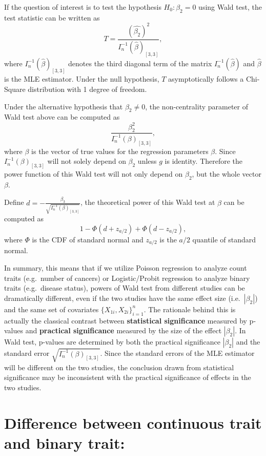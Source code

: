 \documentclass[
]{article}
\begin{document}
If the question of interest is to test the hypothesis \(H_0: \beta_2=0\)
using Wald test, the test statistic can be written as
\[T = \frac{(\hat{\beta_2})^2}{I_n^{-1}(\hat{\beta})_{[3,3]}},\] where
\(I_n^{-1}(\hat{\beta})_{[3,3]}\) denotes the third diagonal term of the
matrix \(I_n^{-1}(\hat{\beta})\) and \(\hat{\beta}\) is the MLE
estimator. Under the null hypothesis, \(T\) asymptotically follows a
Chi-Square distribution with 1 degree of freedom.

Under the alternative hypothesis that \(\beta_2 \neq 0\), the
non-centrality parameter of Wald test above can be computed as
\[\frac{\beta_2^2}{I_n^{-1}(\beta)_{[3,3]}},\] where \(\beta\) is the
vector of true values for the regression parameters \(\beta\). Since
\(I_n^{-1}(\beta)_{[3,3]}\) will not solely depend on \(\beta_2\) unless
\(g\) is identity. Therefore the power function of this Wald test will
not only depend on \(\beta_2\), but the whole vector \(\beta\).

Define \(d=-\frac{\beta_3}{\sqrt{I_n^{-1}(\beta)_{[3,3]}}}\), the
theoretical power of this Wald test at \(\beta\) can be computed as
\[1-\Phi(d+z_{a/2})+\Phi(d-z_{a/2}),\] where \(\Phi\) is the CDF of
standard normal and \(z_{a/2}\) is the \(a/2\) quantile of standard
normal.

In summary, this means that if we utilize Poisson regression to analyze
count traits (e.g.~number of cancers) or Logistic/Probit regression to
analyze binary traits (e.g.~disease status), powers of Wald test from
different studies can be dramatically different, even if the two studies
have the same effect size (i.e.~\(|\beta_2|\)) and the same set of
covariates \(\{X_{1i},X_{2i}\}_{i=1}^n\). The rationale behind this is
actually the classical contrast between
\textbf{statistical significance} measured by p-values and
\textbf{practical significance} measured by the size of the effect
\(|\beta_2|\). In Wald test, p-values are determined by both the
practical significance \(|\beta_2|\) and the standard error
\(\sqrt{I_n^{-1}(\beta)_{[3,3]}}\). Since the standard errors of the MLE
estimator will be different on the two studies, the conclusion drawn
from statistical significance may be inconsistent with the practical
significance of effects in the two studies.

\hypertarget{difference-between-continuous-trait-and-binary-trait}{%
\section{Difference between continuous trait and binary
trait:}\label{difference-between-continuous-trait-and-binary-trait}}
\end{document}
